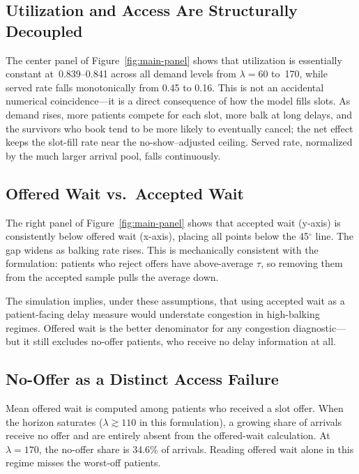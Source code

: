 \documentclass[11pt]{article}
\begin{document}
\subsection{Utilization and Access Are Structurally Decoupled}

The center panel of Figure~\ref{fig:main-panel} shows that utilization is
essentially constant at~0.839--0.841 across all demand levels from
$\lambda = 60$ to~170, while served rate falls monotonically from 0.45 to
0.16. This is not an accidental numerical coincidence---it is a direct
consequence of how the model fills slots. As demand rises, more patients
compete for each slot, more balk at long delays, and the survivors who book
tend to be more likely to eventually cancel; the net effect keeps the slot-fill
rate near the no-show--adjusted ceiling. Served rate, normalized by the much
larger arrival pool, falls continuously.

\subsection{Offered Wait vs.\ Accepted Wait}

The right panel of Figure~\ref{fig:main-panel} shows that accepted wait
(y-axis) is consistently below offered wait (x-axis), placing all points
below the 45$^\circ$ line. The gap widens as balking rate rises. This is
mechanically consistent with the formulation: patients who reject offers
have above-average $\tau$, so removing them from the accepted sample
pulls the average down.

The simulation implies, under these assumptions, that using accepted wait as
a patient-facing delay measure would understate congestion in high-balking
regimes. Offered wait is the better denominator for any congestion
diagnostic---but it still excludes no-offer patients, who receive no delay
information at all.

\subsection{No-Offer as a Distinct Access Failure}

Mean offered wait is computed among patients who received a slot offer.
When the horizon saturates ($\lambda \gtrsim 110$ in this formulation),
a growing share of arrivals receive no offer and are entirely absent from
the offered-wait calculation. At $\lambda = 170$, the no-offer share is
34.6\% of arrivals. Reading offered wait alone in this regime misses the
worst-off patients.
\end{document}
